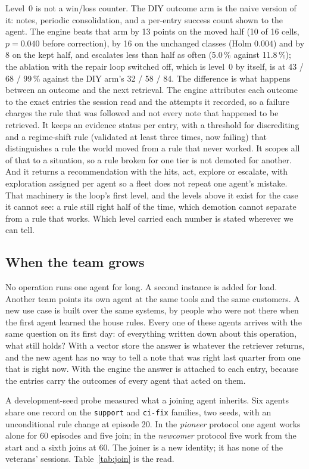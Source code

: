 \documentclass[11pt]{article}
\newcommand{\code}[1]{\texttt{#1}}
\begin{document}
Level~0 is not a win/loss counter. The DIY outcome arm is the naive version of it: notes,
periodic consolidation, and a per-entry success count shown to the agent. The engine beats
that arm by 13 points on the moved half (10 of 16 cells, $p = 0.040$ before correction), by 16
on the unchanged classes (Holm $0.004$) and by 8 on the kept half, and escalates less than half
as often (5.0\,\% against 11.8\,\%); the ablation with the repair loop switched off, which is
level~0 by itself, is at 43 / 68 / 99\,\% against the DIY arm's 32 / 58 / 84. The difference is
what happens between an outcome and the next retrieval. The engine attributes each outcome to the exact entries the
session read and the attempts it recorded, so a failure charges the rule that was followed and
not every note that happened to be retrieved. It keeps an evidence status per entry, with a
threshold for discrediting and a regime-shift rule (validated at least three times, now
failing) that distinguishes a rule the world moved from a rule that never worked. It scopes all
of that to a situation, so a rule broken for one tier is not demoted for another. And it returns
a recommendation with the hits, act, explore or escalate, with exploration assigned per agent
so a fleet does not repeat one agent's mistake. That machinery is the loop's first level, and
the levels above it exist for the case it cannot see: a rule still right half of the time, which
demotion cannot separate from a rule that works. Which level carried each number is stated
wherever we can tell.

\subsection{When the team grows}
\label{sec:team}

No operation runs one agent for long. A second instance is added for load. Another team points
its own agent at the same tools and the same customers. A new use case is built over the same
systems, by people who were not there when the first agent learned the house rules. Every one of
these agents arrives with the same question on its first day: of everything written down about
this operation, what still holds? With a vector store the answer is whatever the retriever
returns, and the new agent has no way to tell a note that was right last quarter from one that is
right now. With the engine the answer is attached to each entry, because the entries carry the
outcomes of every agent that acted on them.

A development-seed probe measured what a joining agent inherits. Six agents share one record on
the \code{support} and \code{ci-fix} families, two seeds, with an unconditional rule change at
episode 20. In the \emph{pioneer} protocol one agent works alone for 60 episodes and five join;
in the \emph{newcomer} protocol five work from the start and a sixth joins at 60. The joiner is
a new identity; it has none of the veterans' sessions. Table~\ref{tab:join} is the read.
\end{document}
